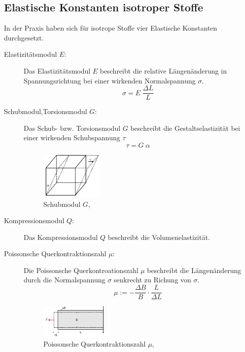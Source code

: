 \subsection{Elastische Konstanten isotroper Stoffe}
In der Praxis haben sich für isotrope Stoffe vier Elastische Konstanten durchgesetzt.\\
\begin{description}
\item[Elastizitätsmodul $E$:]
    Das Elastizitätsmodul $E$ beschreibt die relative Längenänderung in Spannungsrichtung
    bei einer wirkenden Normalspannung $\sigma$.
    \begin{equation}
        \sigma = E \; \frac{\Delta L}{L}
        \label{eqn:def_elastizitätsmodul}
    \end{equation}

\item[Schubmodul,Torsionsmodul $G$:]
    Das Schub- bzw. Torsionsmodul $G$ beschreibt die Gestaltselastizität bei einer
    wirkenden Schubspannung $\tau$
    \begin{equation}
        \tau = G \; \alpha
        \label{eqn:def_schubmodul}
    \end{equation}
    
    \begin{figure}[h]
        \centering
        \includegraphics[width=0.3\textwidth, height=0.2\textwidth]{bilder/Schubmodul.jpg}
        \caption{Schubmodul $G$,\cite[4]{Anleitung}}        
        \label{fig:schubmodul}
    \end{figure}

\item[Kompressionsmodul $Q$:]
    Das Kompressionsmodul $Q$ beschreibt die Volumenelastizität.

\newpage
\item[Poissonsche Querkontraktionszahl $\mu$:]
    Die Poissonsche Querkontroationszahl $\mu$ beschreibt die Längenänderung durch die Normalspannung $\sigma$
    senkrecht zu Richung von $\sigma$.
    \begin{equation}
        \mu := -\frac{\Delta B}{B} \cdot \frac{L}{\Delta L}
        \label{eqn:def_poissonsche}
    \end{equation}
    
    \begin{figure}[h]
        \centering
        \includegraphics[width=0.35\textwidth, height=0.15\textwidth]{bilder/Poissonsche_Quer.jpg}
        \caption{Poissonsche Querkontraktionszahl $\mu$,\cite[3]{Anleitung}}        
        \label{fig:poissonsche_Quer}
    \end{figure}
\end{description}


